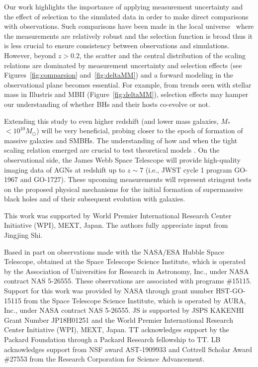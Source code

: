 \documentclass[twocolumn]{aastex631}
\def\smass{{$M_*$}}
\begin{document}
Our work highlights the importance of applying measurement uncertainty and the effect of selection to the simulated data in order to make direct comparisons with observations. Such comparisons have been made in the local universe~\citep[e.g.,][]{Habouzit2021} where the measurements are relatively robust and the selection function is broad thus it is less crucial to ensure consistency between observations and simulations. However, beyond $z>0.2$, the scatter and the central distribution of the scaling relations are dominated by measurement uncertainty and selection effects (see Figures~\ref{fig:comparsion} and~\ref{fig:deltaMM}) and a forward modeling in the observational plane becomes essential. For example, from trends seen with stellar mass in Illustris and MBII (Figure~\ref{fig:deltaMM}), selection effects may hamper our understanding of whether BHs and their hosts co-evolve or not.

Extending this study to even higher redshift (and lower mass galaxies, \smass\ $<10^{10}M_{\odot}$) will be very beneficial, probing closer to the epoch of formation of massive galaxies and SMBHs. The understanding of how and when the tight scaling relation emerged are crucial to test theoretical models \citep{Volonteri2021}. On the observational side, the James Webb Space Telescope will provide high-quality imaging data of AGNs at redshift up to $z\sim7$ (i.e., JWST cycle 1 program GO-1967 and GO-1727). These upcoming measurements will represent stringent tests on the proposed physical mechanisms for the initial formation of supermassive black holes and of their subsequent evolution with galaxies.

\begin{acknowledgments}
This work was supported by World Premier International Research Center Initiative (WPI), MEXT, Japan. 
The authors fully appreciate input from Jingjing Shi.

Based in part on observations made with the NASA/ESA Hubble Space Telescope, obtained at the Space Telescope Science Institute, which is operated by the Association of Universities for Research in Astronomy, Inc., under NASA contract NAS 5-26555. These observations are associated with programs \#15115. Support for this work was provided by NASA through grant number HST-GO-15115 from the Space Telescope Science Institute, which is operated by AURA, Inc., under NASA contract NAS 5-26555. 
JS is supported by JSPS KAKENHI Grant Number JP18H01251 and the World Premier International Research Center Initiative (WPI), MEXT, Japan.
TT acknowledges support by the Packard Foundation through a Packard Research fellowship to TT. LB acknowledges support from NSF award AST-1909933 and Cottrell Scholar Award \#27553 from the Research Corporation for Science Advancement.


\end{acknowledgments}
\end{document}
